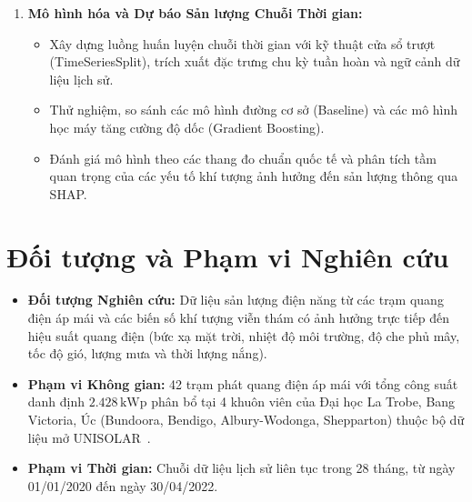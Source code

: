 \documentclass[12pt, a4paper]{report}
\begin{document}
\begin{enumerate}[label=\arabic*., leftmargin=*]
    \item \textbf{Mô hình hóa và Dự báo Sản lượng Chuỗi Thời gian:}
    \begin{itemize}[noitemsep]
        \item Xây dựng luồng huấn luyện chuỗi thời gian với kỹ thuật cửa sổ trượt (TimeSeriesSplit), trích xuất đặc trưng chu kỳ tuần hoàn và ngữ cảnh dữ liệu lịch sử.
        \item Thử nghiệm, so sánh các mô hình đường cơ sở (Baseline) và các mô hình học máy tăng cường độ dốc (Gradient Boosting).
        \item Đánh giá mô hình theo các thang đo chuẩn quốc tế và phân tích tầm quan trọng của các yếu tố khí tượng ảnh hưởng đến sản lượng thông qua SHAP.
    \end{itemize}
\end{enumerate}

\section{Đối tượng và Phạm vi Nghiên cứu}
\label{sec:phamvi}

\begin{itemize}[noitemsep]
    \item \textbf{Đối tượng Nghiên cứu:} Dữ liệu sản lượng điện năng từ các trạm quang điện áp mái và các biến số khí tượng viễn thám có ảnh hưởng trực tiếp đến hiệu suất quang điện (bức xạ mặt trời, nhiệt độ môi trường, độ che phủ mây, tốc độ gió, lượng mưa và thời lượng nắng).
    \item \textbf{Phạm vi Không gian:} 42 trạm phát quang điện áp mái với tổng công suất danh định $2.428\,\text{kWp}$ phân bổ tại 4 khuôn viên của Đại học La Trobe, Bang Victoria, Úc (Bundoora, Bendigo, Albury-Wodonga, Shepparton) thuộc bộ dữ liệu mở UNISOLAR~\cite{wimalaratne2022unisolar}.
    \item \textbf{Phạm vi Thời gian:} Chuỗi dữ liệu lịch sử liên tục trong 28 tháng, từ ngày 01/01/2020 đến ngày 30/04/2022.
\end{itemize}
\end{document}
